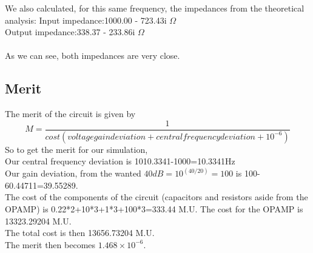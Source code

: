 We also calculated, for this same frequency, the impedances from the theoretical analysis:
Input impedance:1000.00 -  723.43i $\Omega$\\
Output impedance:338.37 - 233.86i $\Omega$\\
\\
As we can see, both impedances are very close.\\

\subsection{Merit}
The merit of the circuit is given by
\begin{equation}
  M=\frac{1}{cost(voltage gain deviation+ central frequency deviation+10^{-6})}
\end{equation}
So to get the merit for our simulation,\\
Our central frequency deviation is 1010.3341-1000=10.3341Hz\\
Our gain deviation, from the wanted $40dB=10^{(40/20)}=100$ is 100-60.44711=39.55289.\\
The cost of the components of the circuit (capacitors and resistors aside from the OPAMP) is 0.22*2+10*3+1*3+100*3=333.44 M.U. The cost for the OPAMP is 13323.29204 M.U.\\
The total cost is then 13656.73204 M.U.\\
The merit then becomes $1.468\times 10^{-6}$.
